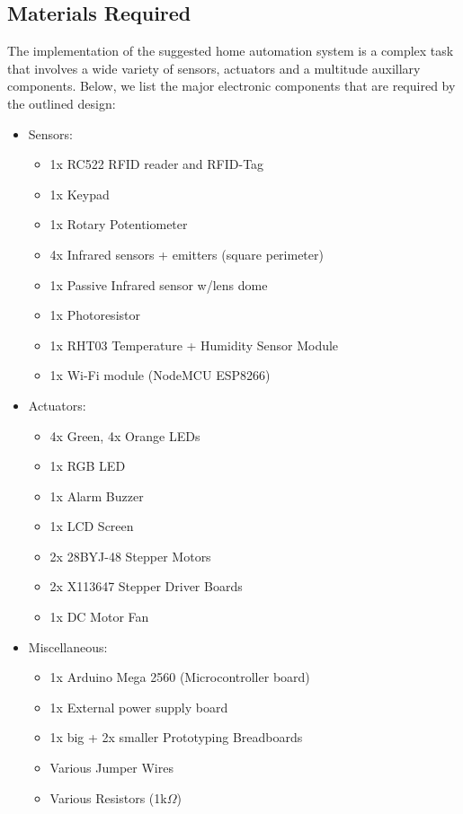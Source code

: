\documentclass[journal,onecolumn]{IEEEtran}
\begin{document}
\subsection{Materials Required}
The implementation of the suggested home automation system is a complex task that involves a wide variety of sensors, actuators and a multitude auxillary components. Below, we list the major electronic components that are required by the outlined design:
\begin{itemize}
	\item{Sensors:}
	\begin{itemize}
		\item{1x RC522 RFID reader and RFID-Tag}
		\item{1x Keypad}
		\item{1x Rotary Potentiometer}
		\item{4x Infrared sensors + emitters (square perimeter)}
		\item{1x Passive Infrared sensor w/lens dome}
		\item{1x Photoresistor}
		\item{1x RHT03 Temperature + Humidity Sensor Module}
		\item{1x Wi-Fi module (NodeMCU ESP8266)}
	\end{itemize}
	\item{Actuators:}
	\begin{itemize}
		\item{4x Green, 4x Orange LEDs}
		\item{1x RGB LED}
		\item{1x Alarm Buzzer}
		\item{1x LCD Screen}
		\item{2x 28BYJ-48 Stepper Motors}
		\item{2x X113647 Stepper Driver Boards}
		\item{1x DC Motor Fan}
	\end{itemize}
	\item{Miscellaneous:}
	\begin{itemize}
		\item{1x Arduino Mega 2560 (Microcontroller board)}
		\item{1x External power supply board}
		\item{1x big + 2x smaller Prototyping Breadboards}
		\item{Various Jumper Wires}
		\item{Various Resistors (1k$\Omega$)}
	\end{itemize}
\end{itemize}
\end{document}
